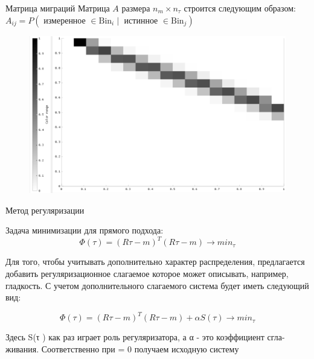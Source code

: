 \documentclass[fullscreen=true,russian,compress,%
	hyperref={unicode,bookmarks=false}]{presentation}
\begin{document}
\begin{frame}{Матрица миграций}
   Матрица $A$ размера $n_{m} \times n_{\tau}$ строится следующим образом:
   $A_{ij} = P( \text{ измеренное } \in \text{Bin}_{i} \mid \text{ истинное } \in \text{Bin}_{j} )$
\begin{figure}[!ht]
   \includegraphics[scale=0.3]{images/gaus_mig_black.png}
\end{figure}
\end{frame}



\begin{frame}{Метод регуляризации}
\begin{block}{}
   Задача минимизации для прямого подхода:
   \begin{equation}
      \Phi(\tau)=(R\tau-m)^T (R\tau-m) \to min_{\tau}
      \label{min_base}
   \end{equation}
\end{block}
\begin{block}{}
   Для того, чтобы учитывать дополнительно характер распределения, предлагается добавить регуляризационное слагаемое  
   которое может описывать, например, гладкость. С учетом дополнительного слагаемого система будет иметь следующий вид: 

   \begin{equation}
      \Phi(\tau)=(R\tau-m)^T (R\tau-m) + \alpha S(\tau) \to min_{\tau}
      \label{min_svd}
   \end{equation}

   Здесь S(τ ) как раз играет роль регуляризатора, а α - это коэффициент сгла-
   живания. Соответственно при \alpha = 0 получаем исходную систему
\end{block}
\end{frame}
\end{document}
